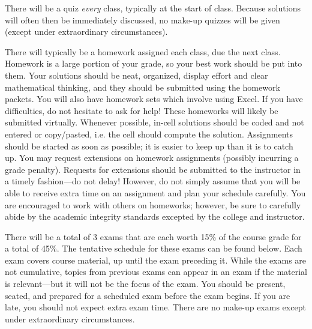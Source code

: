 \documentclass[11pt,letterpaper]{article}
\begin{document}
There will be a quiz \textit{every} class, typically at the start of class. Because solutions will often then be immediately discussed, no make-up quizzes will be given (except under extraordinary circumstances). \pspace


There will typically be a homework assigned each class, due the next class. Homework is a large portion of your grade, so your best work should be put into them. Your solutions should be neat, organized, display effort and clear mathematical thinking, and they should be submitted using the homework packets. You will also have homework sets which involve using Excel. If you have difficulties, do not hesitate to ask for help! These homeworks will likely be submitted virtually. Whenever possible, in-cell solutions should be coded and not entered or copy/pasted, i.e. the cell should compute the solution. Assignments should be started as soon as possible; it is easier to keep up than it is to catch up. You may request extensions on homework assignments (possibly incurring a grade penalty). Requests for extensions should be submitted to the instructor in a timely fashion---do not delay! However, do not simply assume that you will be able to receive extra time on an assignment and plan your schedule carefully. You are encouraged to work with others on homeworks; however, be sure to carefully abide by the academic integrity standards excepted by the college and instructor. \pspace


There will be a total of 3 exams that are each worth 15\% of the course grade for a total of 45\%. The tentative schedule for these exams can be found below. Each exam covers course material, up until the exam preceding it. While the exams are not cumulative, topics from previous exams can appear in an exam if the material is relevant---but it will not be the focus of the exam. You should be present, seated, and prepared for a scheduled exam before the exam begins. If you are late, you should not expect extra exam time. There are no make-up exams except under extraordinary circumstances. \pspace
\end{document}
